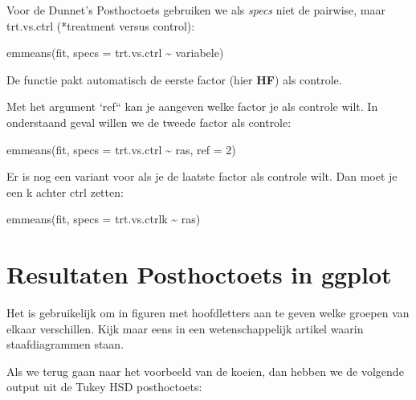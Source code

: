 \documentclass[
  letterpaper,
  DIV=11,
  numbers=noendperiod]{scrreprt}
\newenvironment{Shaded}{\begin{snugshade}}{\end{snugshade}}
\newcommand{\AttributeTok}[1]{\textcolor[rgb]{0.40,0.45,0.13}{#1}}
\newcommand{\DecValTok}[1]{\textcolor[rgb]{0.68,0.00,0.00}{#1}}
\newcommand{\FunctionTok}[1]{\textcolor[rgb]{0.28,0.35,0.67}{#1}}
\newcommand{\NormalTok}[1]{\textcolor[rgb]{0.00,0.23,0.31}{#1}}
\newcommand{\SpecialCharTok}[1]{\textcolor[rgb]{0.37,0.37,0.37}{#1}}
\theoremstyle{definition}
\theoremstyle{remark}
\begin{document}
Voor de Dunnet's Posthoctoets gebruiken we als \emph{specs} niet de
pairwise, maar trt.vs.ctrl (*treatment versus control):

\begin{Shaded}
\begin{Highlighting}[]
\FunctionTok{emmeans}\NormalTok{(fit, }\AttributeTok{specs =}\NormalTok{ trt.vs.ctrl }\SpecialCharTok{\textasciitilde{}}\NormalTok{ variabele)}
\end{Highlighting}
\end{Shaded}

De functie pakt automatisch de eerste factor (hier \textbf{HF}) als
controle.

Met het argument `ref`` kan je aangeven welke factor je als controle
wilt. In onderstaand geval willen we de tweede factor als controle:

\begin{Shaded}
\begin{Highlighting}[]
\FunctionTok{emmeans}\NormalTok{(fit, }\AttributeTok{specs =}\NormalTok{ trt.vs.ctrl }\SpecialCharTok{\textasciitilde{}}\NormalTok{ ras, }\AttributeTok{ref =} \DecValTok{2}\NormalTok{)}
\end{Highlighting}
\end{Shaded}

Er is nog een variant voor als je de laatste factor als controle wilt.
Dan moet je een k achter ctrl zetten:

\begin{Shaded}
\begin{Highlighting}[]
\FunctionTok{emmeans}\NormalTok{(fit, }\AttributeTok{specs =}\NormalTok{ trt.vs.ctrlk }\SpecialCharTok{\textasciitilde{}}\NormalTok{ ras)}
\end{Highlighting}
\end{Shaded}

\hypertarget{resultaten-posthoctoets-in-ggplot}{%
\section{Resultaten Posthoctoets in
ggplot}\label{resultaten-posthoctoets-in-ggplot}}

Het is gebruikelijk om in figuren met hoofdletters aan te geven welke
groepen van elkaar verschillen. Kijk maar eens in een wetenschappelijk
artikel waarin staafdiagrammen staan.

Als we terug gaan naar het voorbeeld van de koeien, dan hebben we de
volgende output uit de Tukey HSD posthoctoets:
\end{document}
